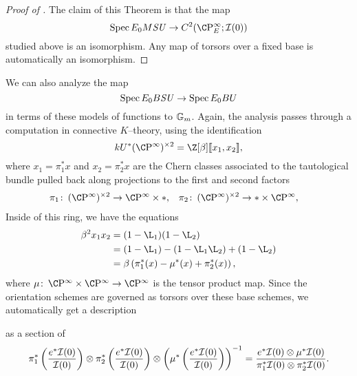 \begin{proof}[Proof of ]
The claim of this Theorem is that the map \[\Spec E_0 M\SU \to C^2(\CP^\infty_E; \sheaf I(0))\] studied above is an isomorphism.  Any map of torsors over a fixed base is automatically an isomorphism.
\end{proof}



\begin{remark}\label{BSUToBU}
We can also analyze the map \[\operatorname{Spec} E_0 B\mathit{SU} \to \operatorname{Spec} E_0 BU\] in terms of these models of functions to $\mathbb G_m$.  Again, the analysis passes through a computation in connective $K$--theory, using the identification \[kU^*(\CP^\infty)^{\times 2} = \Z[\beta]\ps{x_1, x_2},\] where $x_1 = \pi_1^* x$ and $x_2 = \pi_2^* x$ are the Chern classes associated to the tautological bundle pulled back along projections to the first and second factors
\begin{align*}
\pi_1\co (\CP^\infty)^{\times 2} & \to \CP^\infty \times *, &
\pi_2\co (\CP^\infty)^{\times 2} & \to * \times \CP^\infty,
\end{align*}
Inside of this ring, we have the equations
\begin{align*}
\beta^2 x_1 x_2 & = (1 - \L_1)(1 - \L_2) \\
& = (1 - \L_1) - (1 - \L_1 \L_2) + (1 - \L_2) \\
& = \beta\left(\pi_1^*(x) - \mu^*(x) + \pi_2^*(x) \right),
\end{align*}
where $\mu\co \CP^\infty \times \CP^\infty \to \CP^\infty$ is the tensor product map.  Since the orientation schemes are governed as torsors over these base schemes, we automatically get a description
\begin{center}
\end{center}
as a section of
\[\pi_1^* \left(\frac{e^* \mathcal{I}(0)}{\mathcal{I}(0)}\right) \otimes \pi_2^* \left(\frac{e^* \mathcal{I}(0)}{\mathcal{I}(0)}\right) \otimes \left(\mu^* \left(\frac{e^* \mathcal{I}(0)}{\mathcal{I}(0)}\right) \right)^{-1} = \frac{e^* \mathcal{I}(0) \otimes \mu^* \mathcal{I}(0)}{\pi_1^* \mathcal{I}(0) \otimes \pi_2^* \mathcal{I}(0)}.\]
\end{remark}

